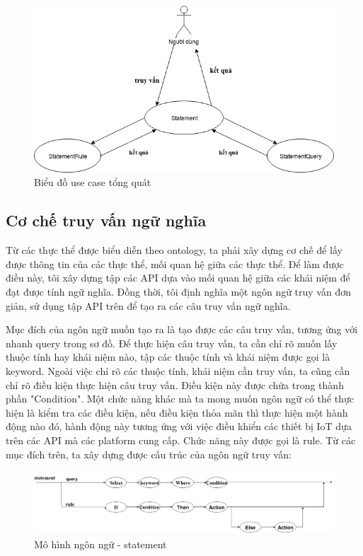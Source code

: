\begin{figure}[h!]
	\center
	\includegraphics[scale=0.6]{image/language_diagram-use_case}
	\caption{Biểu đồ use case tổng quát}
\end{figure}



\subsection{Cơ chế truy vấn ngữ nghĩa}
Từ các thực thể được biểu diễn theo ontology, ta phải xây dựng cơ chế để lấy được thông tin của các thực thể, mối quan hệ giữa các thực thể. Để làm được điều này, tôi xây dựng tập các API dựa vào mối quan hệ giữa các khái niệm để đạt được tính ngữ nghĩa. Đồng thời, tôi định nghĩa một ngôn ngữ truy vấn đơn giản, sử dụng tập API trên để tạo ra các câu truy vấn ngữ nghĩa.

Mục đích của ngôn ngữ muốn tạo ra là tạo được các câu truy vấn, tương ứng với nhanh query trong sơ đồ. Để thực hiện câu truy vấn, ta cần chỉ rõ muốn lấy thuộc tính hay khái niệm nào, tập các thuộc tính và khái niệm được gọi là keyword. Ngoài việc chỉ rõ các thuộc tính, khái niệm cần truy vấn, ta cũng cần chỉ rõ điều kiện thực hiện câu truy vấn. Điều kiện này được chứa trong thành phần "Condition". Một chức năng khác mà ta mong muốn ngôn ngữ có thể thực hiện là kiểm tra các điều kiện, nếu điều kiện thỏa mãn thì thực hiện một hành động nào đó, hành động này tương ứng với việc điều khiển các thiết bị IoT dựa trên các API mà các platform cung cấp. Chức năng này được gọi là rule. 
Từ các mục đích trên, ta xây dựng được cấu trúc của ngôn ngữ truy vấn:


\begin{figure}[h!]
	\center
	\includegraphics[scale=0.3]{image/language_model-statement}
	\caption{Mô hình ngôn ngữ - statement}
\end{figure}


